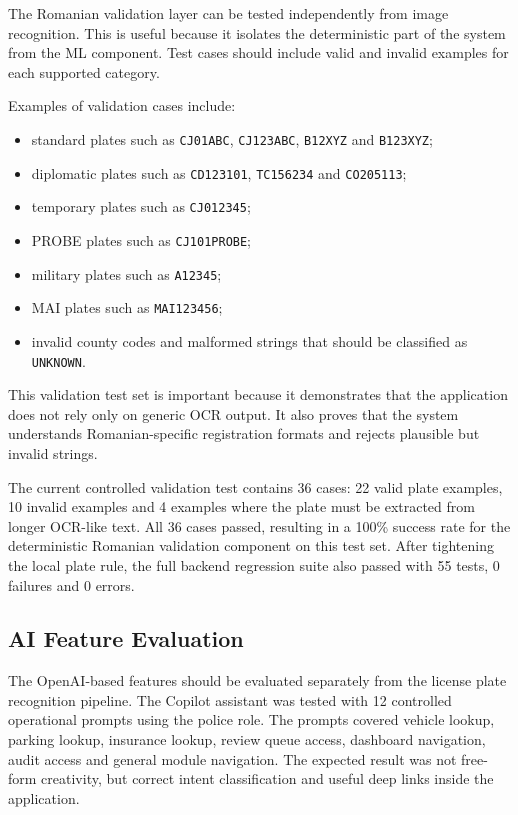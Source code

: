 ﻿\documentclass[12pt,a4paper]{article}
\begin{document}
The Romanian validation layer can be tested independently from image recognition. This is useful because it isolates the deterministic part of the system from the ML component. Test cases should include valid and invalid examples for each supported category.

Examples of validation cases include:

\begin{itemize}
    \item standard plates such as \texttt{CJ01ABC}, \texttt{CJ123ABC}, \texttt{B12XYZ} and \texttt{B123XYZ};
    \item diplomatic plates such as \texttt{CD123101}, \texttt{TC156234} and \texttt{CO205113};
    \item temporary plates such as \texttt{CJ012345};
    \item PROBE plates such as \texttt{CJ101PROBE};
    \item military plates such as \texttt{A12345};
    \item MAI plates such as \texttt{MAI123456};
    \item invalid county codes and malformed strings that should be classified as \texttt{UNKNOWN}.
\end{itemize}

This validation test set is important because it demonstrates that the application does not rely only on generic OCR output. It also proves that the system understands Romanian-specific registration formats and rejects plausible but invalid strings.

The current controlled validation test contains 36 cases: 22 valid plate examples, 10 invalid examples and 4 examples where the plate must be extracted from longer OCR-like text. All 36 cases passed, resulting in a 100\% success rate for the deterministic Romanian validation component on this test set. After tightening the local plate rule, the full backend regression suite also passed with 55 tests, 0 failures and 0 errors.

\subsection{AI Feature Evaluation}

The OpenAI-based features should be evaluated separately from the license plate recognition pipeline. The Copilot assistant was tested with 12 controlled operational prompts using the police role. The prompts covered vehicle lookup, parking lookup, insurance lookup, review queue access, dashboard navigation, audit access and general module navigation. The expected result was not free-form creativity, but correct intent classification and useful deep links inside the application.
\end{document}
